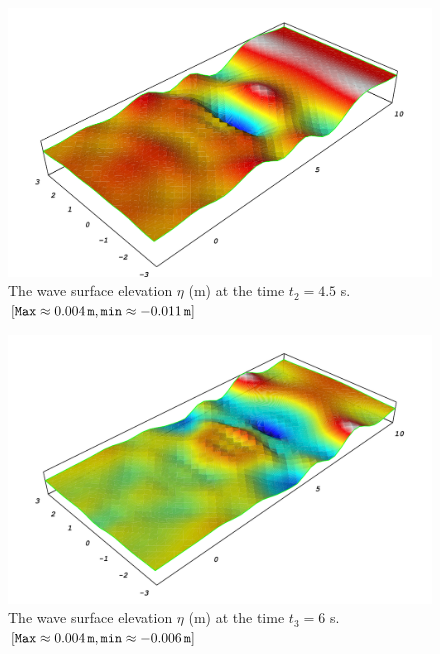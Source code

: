 \begin{figure}
  \begin{center}
    \includegraphics[width=\largefig]{chapters/lopes/pdf/eta45.pdf}
    \caption{The wave surface elevation $\eta$ (m) at the time
      $t_2=4.5$ s. $[{\tt Max}\approx 0.004\, {\tt m}, {\tt
  min}\approx-0.011\, {\tt m}]$}
    \label{fig:lopes:objectsurface2}
  \end{center}
\end{figure}

\begin{figure}
  \begin{center}
    \includegraphics[width=\largefig]{chapters/lopes/pdf/eta6.pdf}
    \caption{The wave surface elevation $\eta$ (m) at the time $t_3=6$
      s. $[{\tt Max}\approx 0.004\, {\tt m}, {\tt min}\approx -0.006\,{\tt
        m}]$}
    \label{fig:lopes:objectsurface3}
  \end{center}
\end{figure}

